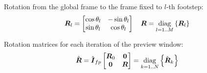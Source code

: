 \documentclass[12pt,a4paper]{article}
\begin{document}
Rotation from the global frame to the frame fixed to $l$-th footstep:
\begin{equation*}
    \mbox{\boldmath $R$}_l = 
    \begin{bmatrix}
        \cos{\theta_l}  &   -\sin{\theta_l} \\
        \sin{\theta_l}  &   \cos{\theta_l} \\
    \end{bmatrix}
    \quad
    \mbox{\boldmath $R$} = \underset{l = 1..M}{\operatorname{diag}}\left\{\mbox{\boldmath $R$}_l\right\}
\end{equation*}

Rotation matrices for each iteration of the preview window:
\begin{equation*}
    \hat{\mbox{\boldmath $R$}} = 
    \hat{\mbox{\boldmath $I$}}_{fp} 
    \begin{bmatrix}
        \mbox{\boldmath $R$}_0     &   \mbox{\boldmath $0$}\\
        \mbox{\boldmath $0$}       &   \mbox{\boldmath $R$}\\
    \end{bmatrix}
    = \underset{k = 1..N}{\operatorname{diag}}\left\{\hat{\mbox{\boldmath $R$}}_k\right\}
\end{equation*}












\end{document}
